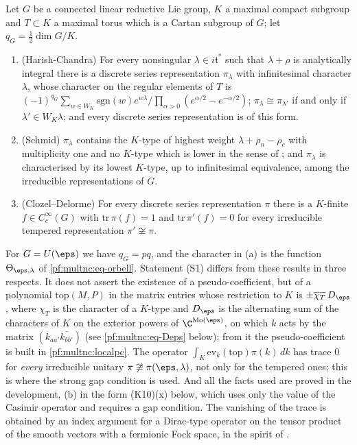 \begin{littheorem}\label{pf:multnc:lit-ds}
Let $G$ be a connected linear reductive Lie group, $K$ a maximal compact subgroup and $T\subset K$ a maximal torus which
is a Cartan subgroup of $G$; let $q_G=\frac12\dim G/K$.
\begin{enumerate}[label=(\alph*)]
\item (Harish-Chandra) For every nonsingular $\lambda\in i\mathfrak t^*$ such that $\lambda+\rho$ is analytically
integral there is a discrete series representation $\pi_\lambda$ with infinitesimal character $\lambda$, whose character
on the regular elements of $T$ is $(-1)^{q_G}\sum_{w\in W_K}\mathrm{sgn}(w)e^{w\lambda}/\prod_{\alpha>0}
(e^{\alpha/2}-e^{-\alpha/2})$; $\pi_\lambda\cong\pi_{\lambda'}$ if and only if $\lambda'\in W_K\lambda$; and every discrete
series representation is of this form.
\item (Schmid) $\pi_\lambda$ contains the $K$-type of highest weight $\lambda+\rho_n-\rho_c$ with multiplicity one and no
$K$-type which is lower in the sense of \cite{Schmid1975}; and $\pi_\lambda$ is characterised by its lowest $K$-type, up to
infinitesimal equivalence, among the irreducible representations of $G$.
\item (Clozel--Delorme) For every discrete series representation $\pi$ there is a $K$-finite $f\in C_c^\infty(G)$ with
$\mathrm{tr}\,\pi(f)=1$ and $\mathrm{tr}\,\pi'(f)=0$ for every irreducible tempered representation $\pi'\not\cong\pi$.
\end{enumerate}
\end{littheorem}

For $G=U(\eps)$ we have $q_G=pq$, and the character in (a) is the function $\Theta_{\eps,\lambda}$ of
\eqref{pf:multnc:eq-orbell}. Statement (S1) differs from these results in three respects. It does not assert the existence
of a pseudo-coefficient, but of a polynomial $\mathrm{top}(M,P)$ in the matrix entries whose restriction to $K$ is
$\pm\overline{\chi_T}\,D_\eps$, where $\chi_T$ is the character of a $K$-type and $D_\eps$ is the alternating sum of the
characters of $K$ on the exterior powers of $\C^{\mathrm{Mo}(\eps)}$, on which $k$ acts by the matrix
$(k_{aa'}\overline{k_{bb'}})$ (see \eqref{pf:multnc:eq-Deps} below); from it the
pseudo-coefficient is built in \cref{pf:multnc:localpc}. The operator $\int_K\mathrm{ev}_k(\mathrm{top})\pi(k)\,dk$ has
trace $0$ for \emph{every} irreducible unitary $\pi\not\cong\pi(\eps,\lambda)$, not only for the tempered ones; this is
where the strong gap condition is used. And all the facts used are proved in the development, (b) in the form (K10)(x)
below, which uses only the value of the Casimir operator and requires a gap condition. The vanishing of the trace
is obtained by an index argument for a Dirac-type operator on the tensor product of the smooth vectors with a fermionic
Fock space, in the spirit of \cite{AtiyahSchmid1977}.

